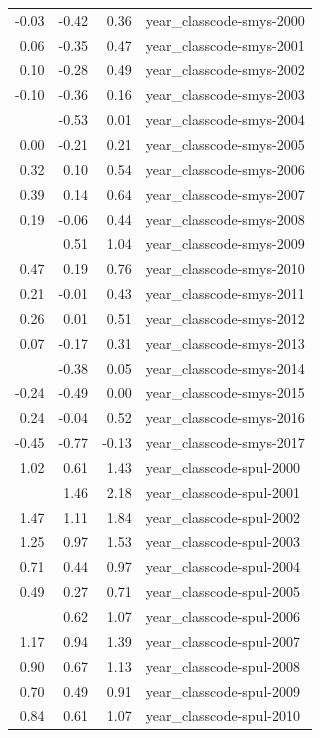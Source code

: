 \documentclass[]{article}
\begin{document}
\begin{longtable}[t]{rrrl}
-0.03 & -0.42 & 0.36 & year\_classcode-smys-2000\\
0.06 & -0.35 & 0.47 & year\_classcode-smys-2001\\
0.10 & -0.28 & 0.49 & year\_classcode-smys-2002\\
-0.10 & -0.36 & 0.16 & year\_classcode-smys-2003\\
\addlinespace
-0.26 & -0.53 & 0.01 & year\_classcode-smys-2004\\
0.00 & -0.21 & 0.21 & year\_classcode-smys-2005\\
0.32 & 0.10 & 0.54 & year\_classcode-smys-2006\\
0.39 & 0.14 & 0.64 & year\_classcode-smys-2007\\
0.19 & -0.06 & 0.44 & year\_classcode-smys-2008\\
\addlinespace
0.77 & 0.51 & 1.04 & year\_classcode-smys-2009\\
0.47 & 0.19 & 0.76 & year\_classcode-smys-2010\\
0.21 & -0.01 & 0.43 & year\_classcode-smys-2011\\
0.26 & 0.01 & 0.51 & year\_classcode-smys-2012\\
0.07 & -0.17 & 0.31 & year\_classcode-smys-2013\\
\addlinespace
-0.17 & -0.38 & 0.05 & year\_classcode-smys-2014\\
-0.24 & -0.49 & 0.00 & year\_classcode-smys-2015\\
0.24 & -0.04 & 0.52 & year\_classcode-smys-2016\\
-0.45 & -0.77 & -0.13 & year\_classcode-smys-2017\\
1.02 & 0.61 & 1.43 & year\_classcode-spul-2000\\
\addlinespace
1.82 & 1.46 & 2.18 & year\_classcode-spul-2001\\
1.47 & 1.11 & 1.84 & year\_classcode-spul-2002\\
1.25 & 0.97 & 1.53 & year\_classcode-spul-2003\\
0.71 & 0.44 & 0.97 & year\_classcode-spul-2004\\
0.49 & 0.27 & 0.71 & year\_classcode-spul-2005\\
\addlinespace
0.84 & 0.62 & 1.07 & year\_classcode-spul-2006\\
1.17 & 0.94 & 1.39 & year\_classcode-spul-2007\\
0.90 & 0.67 & 1.13 & year\_classcode-spul-2008\\
0.70 & 0.49 & 0.91 & year\_classcode-spul-2009\\
0.84 & 0.61 & 1.07 & year\_classcode-spul-2010\\

\end{longtable}
\end{document}
